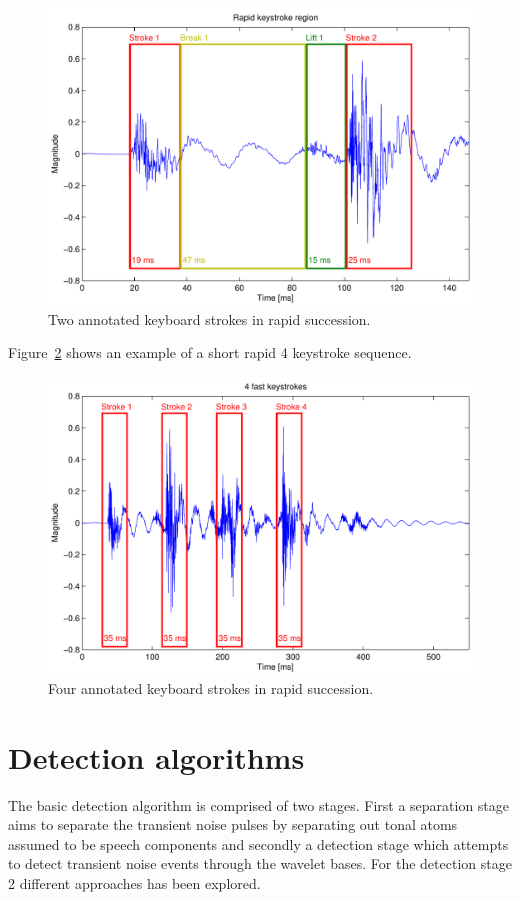 \begin{figure}[!] %
\centering
\includegraphics[width=120mm]{Keyboard2StrokesFast.pdf}
\caption{Two annotated keyboard strokes in rapid succession.}\label{fig:Keyboard2StrokesFast}
\end{figure}

Figure~\ref{fig:Keyboard4StrokesFast} shows an example of a short rapid 4 keystroke sequence.

\begin{figure}[!] %
\centering
\includegraphics[width=120mm]{Keyboard4StrokesFast.pdf}
\caption{Four annotated keyboard strokes in rapid succession.}\label{fig:Keyboard4StrokesFast}
\end{figure}

\section{Detection algorithms}\label{sec:WPdetection}
The basic detection algorithm is comprised of two stages. First a separation stage aims to separate the transient noise pulses by separating out tonal atoms assumed to be speech components and secondly a detection stage which attempts to detect transient noise events through the wavelet bases. For the detection stage 2 different approaches has been explored.

